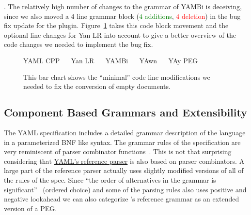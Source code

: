 . The relatively high number of changes to the grammar of YAMBi is deceiving, since we also moved a 4 line grammar block (\textcolor{Green}{$4$ additions}, \textcolor{Red}{$4$ deletion}) in the bug fix update for the plugin. Figure~\ref{fig:empty_document_minimum_count} takes this code block movement and the optional line changes for Yan LR into account to give a better overview of the code changes we needed to implement the bug fix.

\begin{figure}[H]
  \begin{bchart}[max=20, width=0.8\textwidth, unit={~Lines of Code}]
  \end{bchart}
  \begin{center}
  \vspace{-0.5cm}
     YAML CPP ~~
     Yan LR ~~
     YAMBi ~~
     YAwn ~~
     YAy PEG
  \vspace{-0.5cm}
  \end{center}
  \caption{This bar chart shows the “minimal” code line modifications we needed to fix the conversion of empty documents.}
  \label{fig:empty_document_minimum_count}
\end{figure}

\subsection{Component Based Grammars and Extensibility}

The \href{http://yaml.org/spec/1.2/spec}{YAML specification} includes a detailed grammar description of the language in a parameterized \gls{BNF} like syntax. The grammar rules of the specification are very reminiscent of parser combinator functions~\cite{hutton1996monadic}. This is not that surprising considering that \href{https://hackage.haskell.org/package/YamlReference}{YAML’s reference parser} is also based on parser combinators. A large part of the reference parser actually uses slightly modified versions of all of the rules of the  spec. Since “the order of alternatives in the grammar is significant”~\cite{ben2009yaml} (ordered choice) and some of the parsing rules also uses positive and negative lookahead we can also categorize ’s reference grammar as an extended version of a \gls{PEG}.

